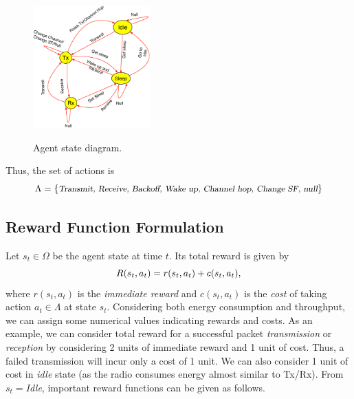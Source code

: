  \begin{figure}%
    \centering%
   \label{fig:statediagram_lora}
   \includegraphics[width=0.4\textwidth]{figs/State_diagram_lora.eps}
      \vspace{-0.15in}
    \caption{\footnotesize Agent state diagram.}%
 \end{figure}
 
 
Thus, the set of actions is
\vspace{-2mm}
 $$
  \vspace{-2mm}
  \Lambda=\{\text{\slshape \small Transmit, Receive, Backoff, Wake up, Channel hop, Change SF, null}\}$$

\subsection{Reward Function Formulation}
Let $s_t\in \Omega$  be the agent state at time $t$. Its total reward is given by 
 \vspace{-2mm}
 $$
\vspace{-2mm}
 R(s_t, a_t) = r(s_t, a_t) + c(s_t, a_t),$$
where $r(s_t, a_t)$ is the {\slshape immediate reward}  and $c(s_t, a_t)$ is the {\slshape cost} of taking action $a_t\in \Lambda$  at state $s_t$. Considering both energy consumption and throughput, we can assign some numerical values indicating rewards and costs. As an example, we can consider total reward for a successful packet {\slshape transmission} or {\slshape reception} by considering 2 units of immediate reward  and 1 unit of cost. Thus, a failed transmission will incur only a cost of 1 unit. We can also consider 1 unit of cost in {\slshape idle} state (as the radio consumes energy almost similar to Tx/Rx). From $s_t=${\slshape Idle}, important reward functions can be given as follows. 


